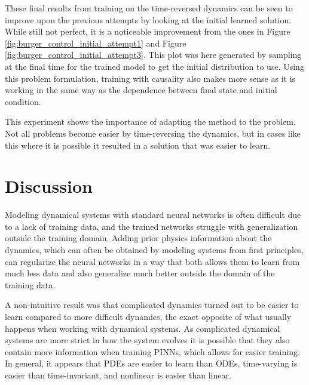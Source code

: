 These final results from training on the time-reversed dynamics can be seen to improve upon the previous attempts by looking at the initial learned solution. While still not perfect, it is a noticeable improvement from the ones in Figure \ref{fig:burger_control_initial_attempt1} and Figure \ref{fig:burger_control_initial_attempt3}. This plot was here generated by sampling at the final time for the trained model to get the initial distribution to use. Using this problem formulation, training with causality also makes more sense as it is working in the same way as the dependence between final state and initial condition.

This experiment shows the importance of adapting the method to the problem. Not all problems become easier by time-reversing the dynamics, but in cases like this where it is possible it resulted in a solution that was easier to learn.


\section{Discussion}


Modeling dynamical systems with standard neural networks is often difficult due to a lack of training data, and the trained networks struggle with generalization outside the training domain. Adding prior physics information about the dynamics, which can often be obtained by modeling systems from first principles, can regularize the neural networks in a way that both allows them to learn from much less data and also generalize much better outside the domain of the training data.

A non-intuitive result was that complicated dynamics turned out to be easier to learn compared to more difficult dynamics, the exact opposite of what usually happens when working with dynamical systems. As complicated dynamical systems are more strict in how the system evolves it is possible that they also contain more information when training PINNs, which allows for easier training. In general, it appears that PDEs are easier to learn than ODEs, time-varying is easier than time-invariant, and nonlinear is easier than linear.

